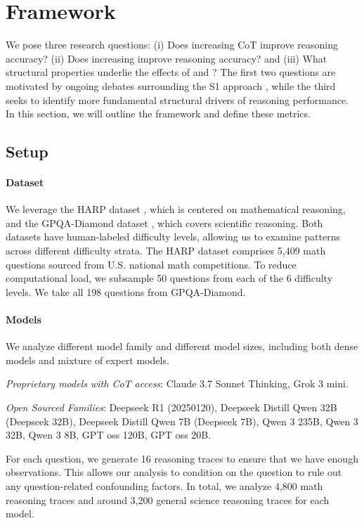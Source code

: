 \section{Framework}\label{sec:lexical}

We pose three research questions: (i) Does increasing CoT \length improve reasoning accuracy? (ii) Does increasing \Review improve reasoning accuracy? and (iii) What structural properties underlie the effects of \length and \Review? The first two questions are motivated by ongoing debates surrounding the S1 approach \citep{muennighoff2025s1}, while the third seeks to identify more fundamental structural drivers of reasoning performance. In this section, we will outline the framework and define these metrics.

\subsection{Setup}

\paragraph{Dataset} \quad We leverage the HARP dataset \citep{yue2024harp}, which is centered on mathematical reasoning, and the GPQA-Diamond dataset \citep{rein2024gpqa}, which covers scientific reasoning. Both datasets have human-labeled difficulty levels, allowing us to examine patterns across different difficulty strata. The HARP dataset comprises 5,409 math questions sourced from U.S. national math competitions. To reduce computational load, we subsample 50 questions from each of the 6 difficulty levels. We take all 198 questions from GPQA-Diamond.

\paragraph{Models} \quad We analyze different model family and different model sizes, including both dense models and mixture of expert models.

\textit{Proprietary models with CoT access}:  Claude 3.7 Sonnet Thinking, Grok 3 mini.

\textit{Open Sourced Families}: Deepseek R1 (20250120), Deepseek Distill Qwen 32B (Deepseek 32B), Deepseek Distill Qwen 7B (Deepseek 7B), Qwen 3 235B, Qwen 3 32B, Qwen 3 8B, GPT oss 120B, GPT oss 20B.

For each question, we generate 16 reasoning traces to ensure that we have enough observations. This allows our analysis to condition on the question to rule out any question-related confounding factors. In total, we analyze 4,800 math reasoning traces and around 3,200 general science reasoning traces for each model.

